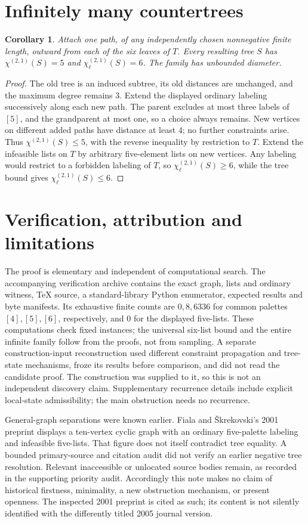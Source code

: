 \documentclass[11pt]{article}
\newtheorem{corollary}{Corollary}
\newcommand{\cp}{\chi^{(2,1)}}
\newcommand{\cl}{\chi_{\ell}^{(2,1)}}
\begin{document}
\section{Infinitely many countertrees}
\begin{corollary}
Attach one path, of any independently chosen nonnegative finite length,
outward from each of the six leaves of \(T\).
Every resulting tree \(S\) has \(\cp(S)=5\) and \(\cl(S)=6\).
The family has unbounded diameter.
\end{corollary}
\begin{proof}
The old tree is an induced subtree, its old distances are unchanged, and
the maximum degree remains \(3\).
Extend the displayed ordinary labeling successively along each new path.
The parent excludes at most three labels of \([5]\), and the grandparent
at most one, so a choice always remains.
New vertices on different added paths have distance at least \(4\);
no further constraints arise. Thus \(\cp(S)\leq5\), with the reverse inequality
by restriction to \(T\).
Extend the infeasible lists on \(T\) by arbitrary five-element lists on
new vertices. Any labeling would restrict to a forbidden labeling of \(T\),
so \(\cl(S)\geq6\), while the tree bound gives \(\cl(S)\leq6\).
\end{proof}

\section{Verification, attribution and limitations}
The proof is elementary and independent of computational search.
The accompanying verification archive contains the exact graph, lists and
ordinary witness, TeX source, a standard-library Python enumerator,
expected results and byte manifests. Its exhaustive finite counts are
\(0,8,6336\) for common palettes \([4],[5],[6]\), respectively, and \(0\)
for the displayed five-lists. These computations check fixed instances;
the universal six-list bound and the entire infinite family follow from
the proofs, not from sampling.
A separate construction-input reconstruction used different constraint
propagation and tree-state mechanisms, froze its results before comparison,
and did not read the candidate proof. The construction was supplied to it,
so this is not an independent discovery claim.
Supplementary recurrence details include explicit local-state admissibility;
the main obstruction needs no recurrence.

General-graph separations were known earlier.
Fiala and \v{S}krekovski's 2001 preprint \cite[Fig.~4, p.~14]{fs}
displays a ten-vertex cyclic graph with an ordinary five-palette labeling
and infeasible five-lists.
That figure does not itself contradict tree equality.
A bounded primary-source and citation audit did not verify an earlier
negative tree resolution. Relevant inaccessible or unlocated source bodies
remain, as recorded in the supporting priority audit.
Accordingly this note makes no claim of historical firstness, minimality,
a new obstruction mechanism, or present openness.
The inspected 2001 preprint is cited as such; its content is not silently
identified with the differently titled 2005 journal version.
\end{document}
